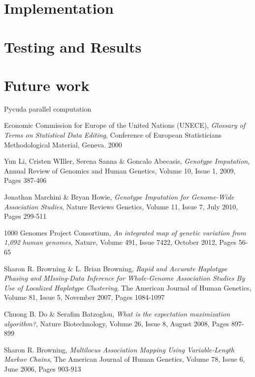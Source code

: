\documentclass[a4paper,12pt,twoside,abstraction,titlepage]{article}
\begin{document}
\section{Implementation}

\newpage
\section{Testing and Results}


\newpage
\section{Future work}
Pycuda parallel computation

\newpage


\begin{thebibliography}{99}

 Economic Commission for Europe of the United Nations (UNECE), \emph{Glossary of Terms on Statistical Data Editing}, Conference of European Statisticians Methodological Material, Geneva. 2000

 Yun Li, Cristen WIller, Serena Sanna \& Goncalo Abecasis, \emph{Genotype Imputation}, Annual Review of Genomics and Human Genetics, Volume 10, Issue 1,  2009, Pages 387-406

 Jonathan Marchini \& Bryan Howie, \emph{Genotype Imputation for Genome-Wide Association Studies}, Nature Reviews Genetics, Volume 11, Issue 7, July 2010, Pages 299-511

 1000 Genomes Project Consortium, \emph{An integrated map of genetic variation from 1,092 human genomes}, Nature, Volume 491, Issue 7422, October 2012, Pages 56-65

 Sharon R. Browning \& L. Brian Browning, \emph{Rapid and Accurate Haplotype Phasing and MIssing-Data Inference for Whole-Genome Association Studies By Use of Localized Haplotype Clustering}, The American Journal of Human Genetics, Volume 81, Issue 5, November 2007, Pages 1084-1097

 Chuong B. Do \& Serafim Batzoglou, \emph{What is the expectation maximization algorithm?}, Nature Biotechnology, Volume 26, Issue 8, August 2008, Pages 897-899


 Sharon R. Browning, \emph{Multilocus Association Mapping Using Variable-Length Markov Chains}, The American Journal of Human Genetics, Volume 78, Issue 6, June 2006, Pages 903-913



\end{thebibliography}
\end{document}
